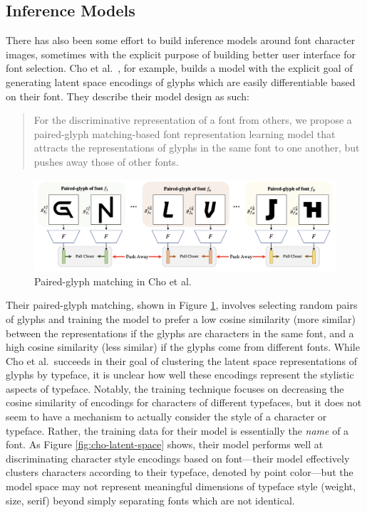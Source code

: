 \subsection{Inference Models}

There has also been some effort to build inference models around font character images, sometimes with the explicit purpose of building better user interface for font selection. Cho et al.\ \cite{cho2022}, for example, builds a model with the explicit goal of generating latent space encodings of glyphs which are easily differentiable based on their font. They describe their model design as such:

\begin{quote}
    For the discriminative representation of a font from others, we propose a paired-glyph matching-based font representation learning model that attracts the representations of glyphs in the same font to one another, but pushes away those of other fonts.
\end{quote}

\begin{figure}
    \centering
    \includegraphics[width=1\textwidth]{images/cho-paired-glyph.png}
    \caption{Paired-glyph matching in Cho et al.\ \cite{cho2022}}
    \label{fig:cho-paired-glyph}
\end{figure}

Their paired-glyph matching, shown in Figure \ref{fig:cho-paired-glyph}, involves selecting random pairs of glyphs and training the model to prefer a low cosine similarity (more similar) between the representations if the glyphs are characters in the same font, and a high cosine similarity (less similar) if the glyphs come from different fonts. While Cho et al.\ succeeds in their goal of clustering the latent space representations of glyphs by typeface, it is unclear how well these encodings represent the stylistic aspects of typeface. Notably, the training technique focuses on decreasing the cosine similarity of encodings for characters of different typefaces, but it does not seem to have a mechanism to actually consider the style of a character or typeface. Rather, the training data for their model is essentially the \emph{name} of a font. As Figure \ref{fig:cho-latent-space} shows, their model performs well at discriminating character style encodings based on font---their model effectively clusters characters according to their typeface, denoted by point color---but the model space may not represent meaningful dimensions of typeface style (weight, size, serif) beyond simply separating fonts which are not identical.


